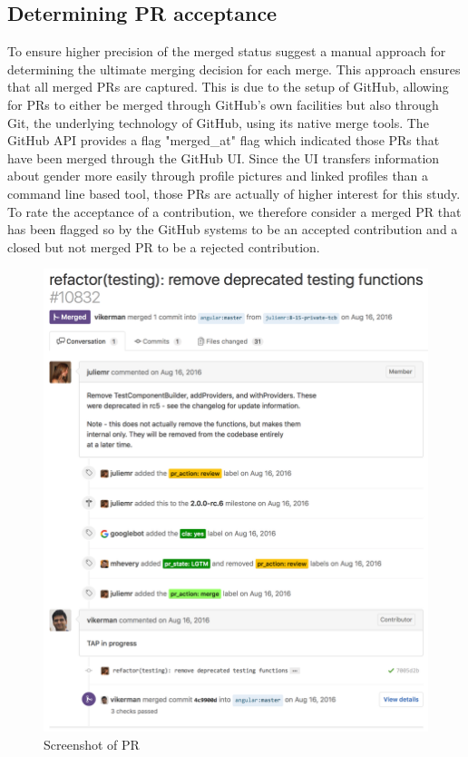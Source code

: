 \subsection{Determining \ac{PR} acceptance}

To ensure higher precision of the merged status \citeauthor{Gousios:2014:ESP:2568225.2568260} suggest a manual approach for determining the ultimate merging decision for each merge. This approach ensures that all merged \ac{PR}s are captured. This is due to the setup of GitHub, allowing for \ac{PR}s to either be merged through GitHub's own facilities but also through Git, the underlying technology of GitHub, using its native merge tools. The GitHub \ac{API} provides a flag "merged\_at" flag which indicated those \ac{PR}s that have been merged through the GitHub UI. Since the UI transfers information about gender more easily through profile pictures and linked profiles than a command line based tool, those \ac{PR}s are actually of higher interest for this study.
To rate the acceptance of a contribution, we therefore consider a merged \ac{PR} that has been flagged so by the GitHub systems to be an accepted contribution and a closed but not merged \ac{PR} to be a rejected contribution.

\begin{figure}
\centering
\includegraphics[width=1\columnwidth]{graphics/PRexample.png}
\caption{Screenshot of \ac{PR}}
\label{figure:prexample}
\end{figure}

